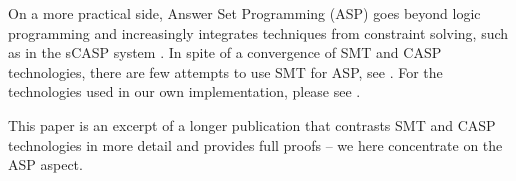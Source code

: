 On a more practical side, Answer Set Programming (ASP) \cite{asp_background,arias19:_const_answer_set_progr_groun_applic}
goes beyond logic programming and increasingly integrates techniques from
constraint solving, such as in the sCASP system
\cite{arias_phd_2019}. In spite of a convergence of SMT and CASP technologies,
there are few attempts to use SMT for ASP, see
\cite{shen_lierler_smt_answer_set_kr_2018}. For the technologies used in our
own implementation, please see . 

This paper is an excerpt of a longer publication \cite{lim22:_autom_defeas_reason_law} that contrasts SMT
and CASP technologies in more detail and provides full proofs -- we here
concentrate on the ASP aspect.


